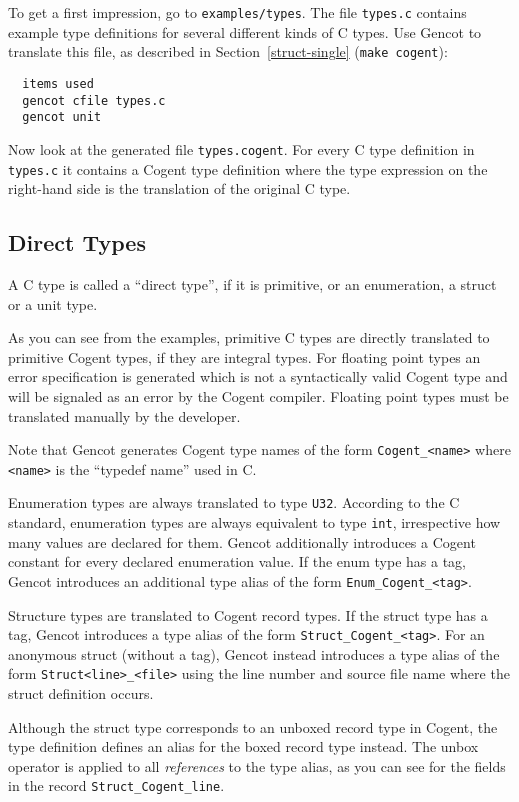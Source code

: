 \documentclass[a4paper]{report}
\newcommand{\code}[1]{\textnormal{\texttt{#1}}}
\begin{document}
To get a first impression, go to \code{examples/types}. The file \code{types.c} contains example type definitions
for several different kinds of C types. Use Gencot to translate this file, as described in Section~\ref{struct-single} 
(\code{make cogent}):
\begin{verbatim}
  items used
  gencot cfile types.c
  gencot unit
\end{verbatim}

Now look at the generated file \code{types.cogent}. For every C type definition in \code{types.c} it contains 
a Cogent type definition where the type expression on the right-hand side is the translation of the original C type.

\subsection{Direct Types}
\label{types-auto-direct}

A C type is called a ``direct type'', if it is primitive, or an enumeration, a struct or a unit type.

As you can see from the examples, primitive C types are directly translated to primitive Cogent types, if they are
integral types. For floating point types an error specification is generated which is not a syntactically valid 
Cogent type and will be signaled as an error by the Cogent compiler. Floating point types must be translated manually
by the developer.

Note that Gencot generates Cogent type names of the form \code{Cogent\_<name>} where \code{<name>} is the ``typedef
name'' used in C. 

Enumeration types are always translated to type \code{U32}. According to the C standard, enumeration types are always
equivalent to type \code{int}, irrespective how many values are declared for them. Gencot additionally introduces
a Cogent constant for every declared enumeration value. If the enum type has a tag, Gencot introduces an additional
type alias of the form \code{Enum\_Cogent\_<tag>}.

Structure types are translated to Cogent record types. If the struct type has a tag, Gencot introduces a type alias
of the form \code{Struct\_Cogent\_<tag>}. For an anonymous struct (without a tag), Gencot instead introduces a type alias
of the form \code{Struct<line>\_<file>} using the line number and source file name where the struct definition occurs.

Although the struct type corresponds to an unboxed record type in Cogent, the type definition defines an alias for the 
boxed record type instead. The unbox operator is applied to all \textit{references} to the type alias, as you can see 
for the fields in the record \code{Struct\_Cogent\_line}.
\end{document}
